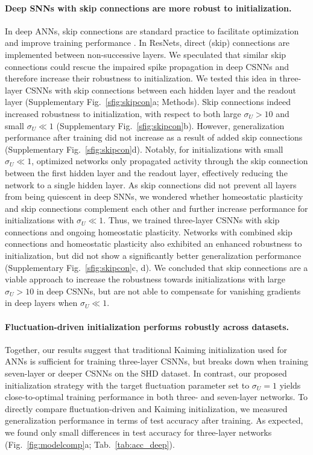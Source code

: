 \documentclass[11pt,a4paper]{article}
\begin{document}
\paragraph{Deep \acp{SNN} with skip connections are more robust to initialization.}
In deep \acp{ANN}, skip connections are standard practice to facilitate optimization and improve training performance \mbox{\citep{Srivastava2015-yw, Srivastava2015-xy, He2016-mi}}. 
In \acp{ResNet}, direct (skip) connections are implemented between non-successive layers.
We speculated that similar skip connections could rescue the impaired spike propagation in deep \acp{CSNN} and therefore increase their robustness to initialization.
We tested this idea in three-layer \acp{CSNN} with skip connections between each hidden layer and the readout layer (Supplementary Fig.~\ref{sfig:skipcon}a; Methods). 
Skip connections indeed increased robustness to initialization, with respect to both large $\sigma_U > 10$ and small $\sigma_U \ll 1$ (Supplementary Fig.~\ref{sfig:skipcon}b).
However, generalization performance after training did not increase as a result of added skip connections (Supplementary Fig.~\ref{sfig:skipcon}d). 
Notably, for initializations with small $\sigma_U \ll 1$, optimized networks only propagated activity through the skip connection between the first hidden layer and the readout layer, effectively reducing the network to a single hidden layer.
As skip connections did not prevent all layers from being quiescent in deep \acp{SNN}, we wondered whether homeostatic plasticity and skip connections complement each other and further increase performance for initializations with $\sigma_U\ll 1$. 
Thus, we trained three-layer \acp{CSNN} with skip connections and ongoing homeostatic plasticity.  
Networks with combined skip connections and homeostatic plasticity also exhibited an enhanced robustness to initialization, but did not show a significantly better generalization performance (Supplementary Fig.~\ref{sfig:skipcon}c, d). 
We concluded that skip connections are a viable approach to increase the robustness towards initializations with large $\sigma_U > 10$ in deep \acp{CSNN}, but are not able to compensate for vanishing gradients in deep layers when $\sigma_U \ll 1$. 

\paragraph{Fluctuation-driven initialization performs robustly across datasets.}
Together, our results suggest that traditional Kaiming initialization used for \acp{ANN} is sufficient for training three-layer \acp{CSNN}, but breaks down when training seven-layer or deeper \acp{CSNN} on the SHD dataset.
In contrast, our proposed initialization strategy with the target fluctuation parameter set to $\sigma_U=1$ yields close-to-optimal training performance in both three- and seven-layer networks.
To directly compare fluctuation-driven and Kaiming initialization, we measured generalization performance in terms of test accuracy after training. 
As expected, we found only small differences in test accuracy for three-layer networks (Fig.~\ref{fig:modelcomp}a; Tab.~\ref{tab:acc_deep}).
\end{document}
